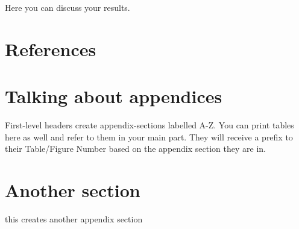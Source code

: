 \documentclass[
  man,floatsintext]{apa7}
\newlength{\cslhangindent}
\newlength{\cslentryspacingunit} %
\newenvironment{CSLReferences}[2] %
 {%
  \setlength{\parindent}{0pt}
  \ifodd #1
  \let\oldpar\par
  \def\par{\hangindent=\cslhangindent\oldpar}
  \fi
  \setlength{\parskip}{#2\cslentryspacingunit}
 }%
 {}
\begin{document}
Here you can discuss your results.

\newpage

\hypertarget{references}{%
\section{References}\label{references}}

\hypertarget{refs}{}
\begin{CSLReferences}{0}{0}
\end{CSLReferences}

\newpage

\hypertarget{appendix-appendix}{%
\appendix}


\hypertarget{talking-about-appendices}{%
\section{Talking about appendices}\label{talking-about-appendices}}

First-level headers create appendix-sections labelled A-Z. You can print tables here as well and refer to them in your main part. They will receive a prefix to their Table/Figure Number based on the appendix section they are in.

\hypertarget{another-section}{%
\section{Another section}\label{another-section}}

this creates another appendix section
\end{document}
